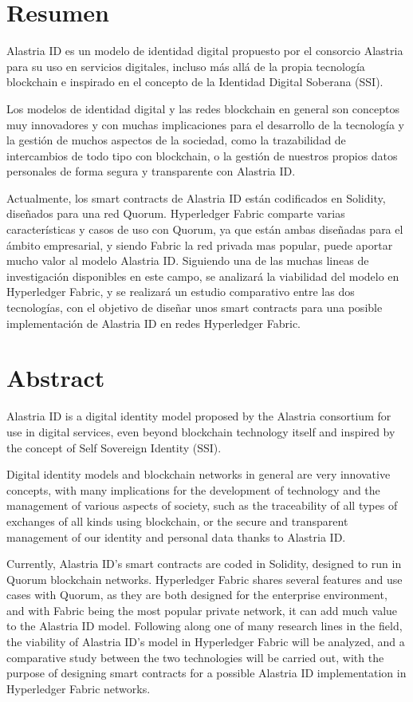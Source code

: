 \chapter*{Resumen}
Alastria ID es un modelo de identidad digital propuesto por el consorcio Alastria para su uso en servicios digitales, incluso más allá de la propia tecnología blockchain e inspirado en el concepto de la Identidad Digital Soberana (SSI).

Los modelos de identidad digital y las redes blockchain en general son conceptos muy innovadores y con muchas implicaciones para el desarrollo de la tecnología y la gestión de muchos aspectos de la sociedad, como la trazabilidad de intercambios de todo tipo con blockchain, o la gestión de nuestros propios datos personales de forma segura y transparente con Alastria ID.

Actualmente, los smart contracts de Alastria ID están codificados en Solidity, diseñados para una red Quorum. Hyperledger Fabric comparte varias características y casos de uso con Quorum, ya que están ambas diseñadas para el ámbito empresarial, y siendo Fabric la red privada mas popular, puede aportar mucho valor al modelo Alastria ID. Siguiendo una de las muchas lineas de investigación disponibles en este campo, se analizará la viabilidad del modelo en Hyperledger Fabric, y se realizará un estudio comparativo entre las dos tecnologías, con el objetivo de diseñar unos smart contracts para una posible implementación de Alastria ID en redes Hyperledger Fabric.

\newpage

\chapter*{Abstract}
Alastria ID is a digital identity model proposed by the Alastria consortium for use in digital services, even beyond blockchain technology itself and inspired by the concept of Self Sovereign Identity (SSI).

Digital identity models and blockchain networks in general are very innovative concepts, with many implications for the development of technology and the management of various aspects of society, such as the traceability of all types of exchanges of all kinds using blockchain, or the secure and transparent management of our identity and personal data thanks to Alastria ID.

Currently, Alastria ID's smart contracts are coded in Solidity, designed to run in Quorum blockchain networks. Hyperledger Fabric shares several features and use cases with Quorum, as they are both designed for the enterprise environment, and with Fabric being the most popular private network, it can add much value to the Alastria ID model. Following along one of many research lines in the field, the viability of Alastria ID's model in Hyperledger Fabric will be analyzed,  and a comparative study between the two technologies will be carried out, with the purpose of designing smart contracts for a possible Alastria ID implementation in Hyperledger Fabric networks.

